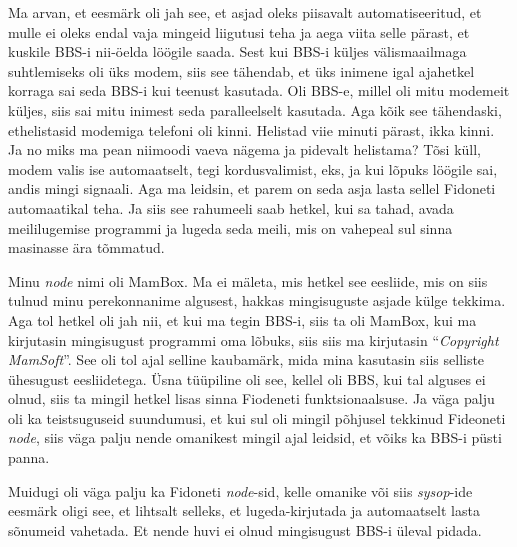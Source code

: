 
Ma arvan, et eesmärk oli jah see, et asjad oleks piisavalt automatiseeritud, et mulle ei oleks endal vaja mingeid liigutusi teha  ja aega viita selle pärast, et kuskile BBS-i nii-öelda löögile saada. Sest kui BBS-i küljes välismaailmaga suhtlemiseks oli üks modem, siis see tähendab, et üks inimene igal ajahetkel korraga sai seda BBS-i kui teenust kasutada. Oli BBS-e, millel oli mitu modemeit küljes, siis sai mitu inimest seda paralleelselt kasutada.  Aga kõik see tähendaski, ethelistasid modemiga telefoni oli kinni. Helistad viie minuti pärast, ikka kinni. Ja no miks ma pean niimoodi vaeva nägema ja pidevalt helistama? Tõsi küll, modem valis ise automaatselt, tegi kordusvalimist, eks, ja kui lõpuks löögile sai, andis mingi signaali. Aga ma leidsin, et parem on seda asja lasta sellel Fidoneti automaatikal teha. Ja siis see rahumeeli saab  hetkel, kui sa tahad, avada meililugemise programmi ja lugeda seda meili, mis on vahepeal sul sinna masinasse ära tõmmatud. 


Minu \emph{node} nimi oli MamBox. Ma ei mäleta, mis hetkel see eesliide, mis on siis tulnud minu perekonnanime algusest,  hakkas mingisuguste asjade külge tekkima. Aga tol hetkel oli jah nii, et kui ma tegin BBS-i, siis ta oli MamBox, kui ma kirjutasin mingisugust programmi  oma lõbuks, siis siis ma kirjutasin \enquote{\emph{Copyright MamSoft}}. See oli tol ajal selline kaubamärk, mida mina kasutasin siis selliste ühesugust eesliidetega. Üsna tüüpiline oli see, kellel oli BBS, kui tal alguses ei olnud, siis ta mingil hetkel lisas sinna  Fiodeneti funktsionaalsuse. Ja väga palju oli ka teistsuguseid suundumusi, et kui sul oli mingil põhjusel tekkinud Fideoneti \emph{node}, siis väga palju nende  omanikest mingil ajal leidsid, et võiks  ka BBS-i püsti panna. 

Muidugi oli väga palju ka Fidoneti \emph{node}-sid, kelle omanike või siis \emph{sysop}-ide eesmärk oligi see, et lihtsalt selleks, et  lugeda-kirjutada ja automaatselt lasta sõnumeid vahetada. Et nende huvi ei olnud mingisugust BBS-i üleval pidada.

